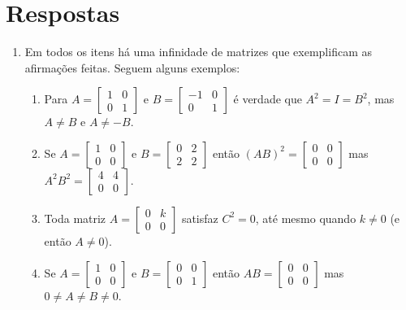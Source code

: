 \documentclass[12pt,a4paper]{article}
\begin{document}
\newpage
\section*{Respostas}
\begin{enumerate}
\item Em todos os itens há uma infinidade de matrizes que exemplificam as afirmações feitas. Seguem alguns exemplos:
\begin{enumerate}
\item Para $A =
\begin{bmatrix}
1 & 0 \\
0 & 1
\end{bmatrix}$ e $B =
\begin{bmatrix}
-1 & 0 \\
 0 & 1
\end{bmatrix}$ é verdade que $A^2 = I = B^2$, mas $A \neq B$ e $A \neq -B$.
\item Se $A =
\begin{bmatrix}
1 & 0 \\
0 & 0
\end{bmatrix}$ e $B =
\begin{bmatrix}
0 & 2 \\
2 & 2
\end{bmatrix}$
então $(AB)^2 = \begin{bmatrix}
0 & 0 \\
0 & 0
\end{bmatrix}$ mas $A^2B^2 = \begin{bmatrix}
4 & 4 \\
0 & 0
\end{bmatrix}$.
\item Toda matriz $A =
\begin{bmatrix}
0 & k \\
0 & 0
\end{bmatrix}$
satisfaz $C^2=0$, até mesmo quando $k \neq 0$ (e então $A \neq 0$).
\item
Se $A =
\begin{bmatrix}
1 & 0 \\
0 & 0
\end{bmatrix}$ e $B =
\begin{bmatrix}
0 & 0 \\
0 & 1
\end{bmatrix}$
então $AB = \begin{bmatrix}
0 & 0 \\
0 & 0
\end{bmatrix}$ mas $0 \neq A \neq B \neq 0$.


\end{enumerate}
\end{enumerate}
\end{document}
